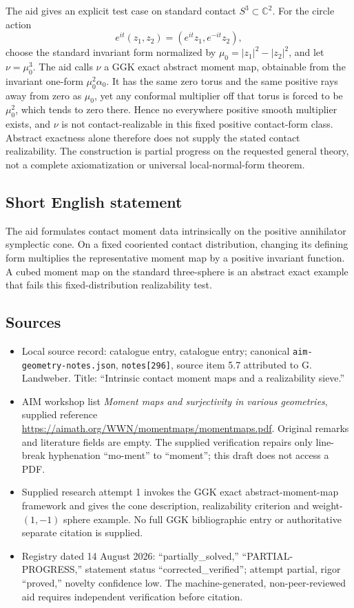 \documentclass[11pt]{article}
\begin{document}
The aid gives an explicit test case on standard contact \(S^3\subset\mathbb C^2\). For the circle action
\[
 e^{it}(z_1,z_2)=(e^{it}z_1,e^{-it}z_2),
\]
choose the standard invariant form normalized by
\(\mu_0=|z_1|^2-|z_2|^2\), and let \(\nu=\mu_0^3\). The aid calls \(\nu\) a GGK exact abstract moment map, obtainable from the invariant one-form \(\mu_0^2\alpha_0\). It has the same zero torus and the same positive rays away from zero as \(\mu_0\), yet any conformal multiplier off that torus is forced to be \(\mu_0^2\), which tends to zero there. Hence no everywhere positive smooth multiplier exists, and \(\nu\) is not contact-realizable in this fixed positive contact-form class. Abstract exactness alone therefore does not supply the stated contact realizability. The construction is partial progress on the requested general theory, not a complete axiomatization or universal local-normal-form theorem.
\subsection{Short English statement}
The aid formulates contact moment data intrinsically on the positive annihilator symplectic cone. On a fixed cooriented contact distribution, changing its defining form multiplies the representative moment map by a positive invariant function. A cubed moment map on the standard three-sphere is an abstract exact example that fails this fixed-distribution realizability test.
\subsection{Sources}
\begin{itemize}
\item Local source record: catalogue entry, catalogue entry; canonical \texttt{aim-geometry-notes.json}, \texttt{notes[296]}, source item 5.7 attributed to G. Landweber. Title: ``Intrinsic contact moment maps and a realizability sieve.''
\item AIM workshop list \emph{Moment maps and surjectivity in various geometries}, supplied reference \url{https://aimath.org/WWN/momentmaps/momentmaps.pdf}. Original remarks and literature fields are empty. The supplied verification repairs only line-break hyphenation ``mo-ment'' to ``moment''; this draft does not access a PDF.
\item Supplied research attempt 1 invokes the GGK exact abstract-moment-map framework and gives the cone description, realizability criterion and weight-\((1,-1)\) sphere example. No full GGK bibliographic entry or authoritative separate citation is supplied.
\item Registry dated 14 August 2026: ``partially\_solved,'' ``PARTIAL-PROGRESS,'' statement status ``corrected\_verified''; attempt partial, rigor ``proved,'' novelty confidence low. The machine-generated, non-peer-reviewed aid requires independent verification before citation.
\end{itemize}
\end{document}
